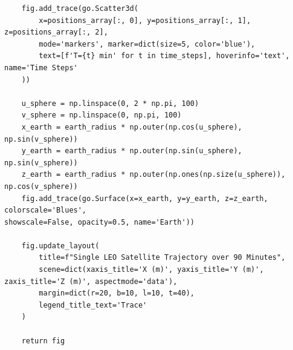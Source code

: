 \documentclass[11pt]{article}
\begin{document}
\begin{Verbatim}
    fig.add_trace(go.Scatter3d(
        x=positions_array[:, 0], y=positions_array[:, 1], z=positions_array[:, 2],
        mode='markers', marker=dict(size=5, color='blue'),
        text=[f'T={t} min' for t in time_steps], hoverinfo='text', name='Time Steps'
    ))

    u_sphere = np.linspace(0, 2 * np.pi, 100)
    v_sphere = np.linspace(0, np.pi, 100)
    x_earth = earth_radius * np.outer(np.cos(u_sphere), np.sin(v_sphere))
    y_earth = earth_radius * np.outer(np.sin(u_sphere), np.sin(v_sphere))
    z_earth = earth_radius * np.outer(np.ones(np.size(u_sphere)), np.cos(v_sphere))
    fig.add_trace(go.Surface(x=x_earth, y=y_earth, z=z_earth, colorscale='Blues',
showscale=False, opacity=0.5, name='Earth'))

    fig.update_layout(
        title=f"Single LEO Satellite Trajectory over 90 Minutes",
        scene=dict(xaxis_title='X (m)', yaxis_title='Y (m)', zaxis_title='Z (m)', aspectmode='data'),
        margin=dict(r=20, b=10, l=10, t=40),
        legend_title_text='Trace'
    )

    return fig
\end{Verbatim}
\end{document}
